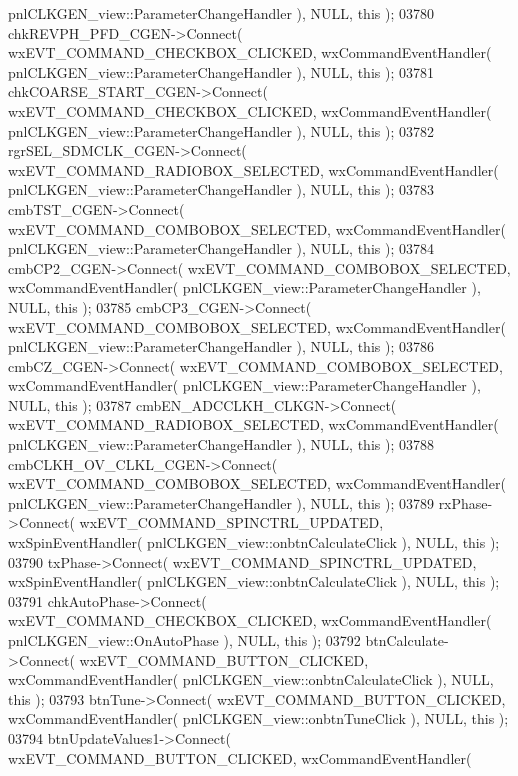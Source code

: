 \begin{DoxyCode}
      pnlCLKGEN_view::ParameterChangeHandler ), NULL, \textcolor{keyword}{this} );
03780     chkREVPH_PFD_CGEN->Connect( wxEVT\_COMMAND\_CHECKBOX\_CLICKED, wxCommandEventHandler( 
      pnlCLKGEN_view::ParameterChangeHandler ), NULL, \textcolor{keyword}{this} );
03781     chkCOARSE_START_CGEN->Connect( wxEVT\_COMMAND\_CHECKBOX\_CLICKED, wxCommandEventHandler( 
      pnlCLKGEN_view::ParameterChangeHandler ), NULL, \textcolor{keyword}{this} );
03782     rgrSEL_SDMCLK_CGEN->Connect( wxEVT\_COMMAND\_RADIOBOX\_SELECTED, wxCommandEventHandler( 
      pnlCLKGEN_view::ParameterChangeHandler ), NULL, \textcolor{keyword}{this} );
03783     cmbTST_CGEN->Connect( wxEVT\_COMMAND\_COMBOBOX\_SELECTED, wxCommandEventHandler( 
      pnlCLKGEN_view::ParameterChangeHandler ), NULL, \textcolor{keyword}{this} );
03784     cmbCP2_CGEN->Connect( wxEVT\_COMMAND\_COMBOBOX\_SELECTED, wxCommandEventHandler( 
      pnlCLKGEN_view::ParameterChangeHandler ), NULL, \textcolor{keyword}{this} );
03785     cmbCP3_CGEN->Connect( wxEVT\_COMMAND\_COMBOBOX\_SELECTED, wxCommandEventHandler( 
      pnlCLKGEN_view::ParameterChangeHandler ), NULL, \textcolor{keyword}{this} );
03786     cmbCZ_CGEN->Connect( wxEVT\_COMMAND\_COMBOBOX\_SELECTED, wxCommandEventHandler( 
      pnlCLKGEN_view::ParameterChangeHandler ), NULL, \textcolor{keyword}{this} );
03787     cmbEN_ADCCLKH_CLKGN->Connect( wxEVT\_COMMAND\_RADIOBOX\_SELECTED, wxCommandEventHandler( 
      pnlCLKGEN_view::ParameterChangeHandler ), NULL, \textcolor{keyword}{this} );
03788     cmbCLKH_OV_CLKL_CGEN->Connect( wxEVT\_COMMAND\_COMBOBOX\_SELECTED, wxCommandEventHandler( 
      pnlCLKGEN_view::ParameterChangeHandler ), NULL, \textcolor{keyword}{this} );
03789     rxPhase->Connect( wxEVT\_COMMAND\_SPINCTRL\_UPDATED, wxSpinEventHandler( 
      pnlCLKGEN_view::onbtnCalculateClick ), NULL, \textcolor{keyword}{this} );
03790     txPhase->Connect( wxEVT\_COMMAND\_SPINCTRL\_UPDATED, wxSpinEventHandler( 
      pnlCLKGEN_view::onbtnCalculateClick ), NULL, \textcolor{keyword}{this} );
03791     chkAutoPhase->Connect( wxEVT\_COMMAND\_CHECKBOX\_CLICKED, wxCommandEventHandler( 
      pnlCLKGEN_view::OnAutoPhase ), NULL, \textcolor{keyword}{this} );
03792     btnCalculate->Connect( wxEVT\_COMMAND\_BUTTON\_CLICKED, wxCommandEventHandler( 
      pnlCLKGEN_view::onbtnCalculateClick ), NULL, \textcolor{keyword}{this} );
03793     btnTune->Connect( wxEVT\_COMMAND\_BUTTON\_CLICKED, wxCommandEventHandler( 
      pnlCLKGEN_view::onbtnTuneClick ), NULL, \textcolor{keyword}{this} );
03794     btnUpdateValues1->Connect( wxEVT\_COMMAND\_BUTTON\_CLICKED, wxCommandEventHandler( 

\end{DoxyCode}

